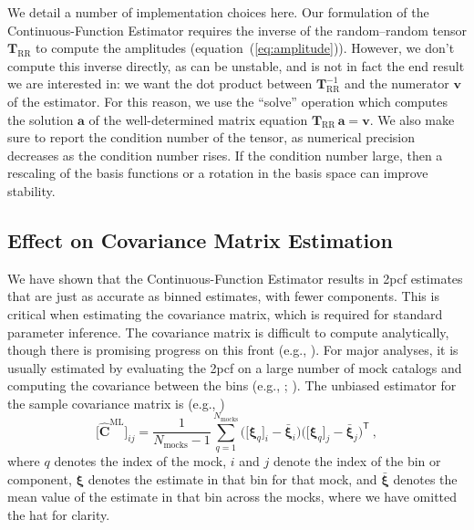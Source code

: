 \documentclass[modern]{aastex62}
\newcommand{\cf}{2pcf\xspace} %
\newcommand{\est}{the Continuous-Function Estimator\xspace}
\newcommand{\eqt}[1]{equation~(\ref{#1})}
\newcommand{\inv}{^{-1}}
\newcommand{\T}{^{\mathsf{T}}}
\newcommand{\bld}[1]{\bm{#1}} %
\newcommand{\vv}[1]{\bld{v}_\mathrm{#1}}
\newcommand{\TT}[1]{\bld{T}_\mathrm{#1}}
\newcommand{\NN}[1]{N_\mathrm{#1}}
\begin{document}
We detail a number of implementation choices here.
Our formulation of \est requires the inverse of the random--random tensor $\TT{RR}$ to compute the amplitudes (\eqt{eq:amplitude}).
However, we don't compute this inverse directly, as can be unstable, and is not in fact the end result we are interested in: we want the dot product between $\TT{RR}\inv$ and the numerator $\vv{}$ of the estimator.
For this reason, we use the ``solve'' operation which computes the solution $\bld{a}$ of the well-determined matrix equation $\TT{RR}\,\bld{a}=\bld{v}$.
We also make sure to report the condition number of the tensor, as numerical precision decreases as the condition number rises.
If the condition number large, then a rescaling of the basis functions or a rotation in the basis space can improve stability.


\subsection{Effect on Covariance Matrix Estimation}
\label{sec:covariance}

We have shown that \est results in \cf estimates that are just as accurate as binned estimates, with fewer components.
This is critical when estimating the covariance matrix, which is required for standard parameter inference.
The covariance matrix is difficult to compute analytically, though there is promising progress on this front (e.g., \citealt{Wadekar2020}).
For major analyses, it is usually estimated by evaluating the \cf on a large number of mock catalogs and computing the covariance between the bins (e.g., \citealt{Reid2010}; \citealt{Anderson2014}).
The unbiased estimator for the sample covariance matrix is (e.g., \citealt{Anderson2003})
\begin{equation}
\big[ \bld{\hat{C}}^\mathrm{ML} \big]_{ij} = \frac{1}{\NN{mocks}-1} \sum_{q=1}^{\NN{mocks}} \bigg( \big[\bld{\xi}_q \big]_i - \bar{\bld{\xi}}_i \bigg) \bigg([\bld{\xi}_q \big]_j - \bar{\bld{\xi}}_j \bigg)\T ~,
\end{equation}
where $q$ denotes the index of the mock, $i$ and $j$ denote the index of the bin or component, $\bld{\xi}$ denotes the estimate in that bin for that mock, and $\bar{\bld{\xi}}$ denotes the mean value of the estimate in that bin across the mocks, where we have omitted the hat for clarity.
\end{document}
